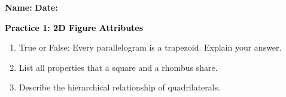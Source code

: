 \documentclass[12pt, letterpaper, fleqn]{article}
\begin{document}
\textbf{Name:} \underline{\hspace{5cm}}
\hfill
\textbf{Date:} \underline{\hspace{3cm}}\\

\begin{tcolorbox}[colback=customteal!20]
    \large\textcolor{black}{\textbf{Practice 1: 2D Figure Attributes}}
\end{tcolorbox}
\begin{enumerate}[itemsep=3.5cm, leftmargin=0.6cm]
\item True or False: Every parallelogram is a trapezoid. Explain your answer.
\vspace{3.5cm}
\item List all properties that a square and a rhombus share.
\vspace{3.5cm}
\item Describe the hierarchical relationship of quadrilaterals.
\end{enumerate}
\end{document}
